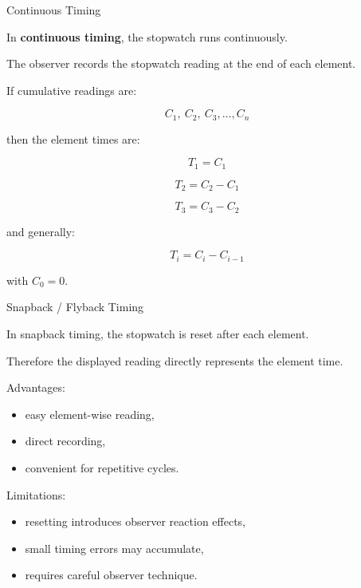 \documentclass[aspectratio=169,10pt]{beamer}
\begin{document}

\begin{frame}[shrink=18]{Continuous Timing}
\small

In \textbf{continuous timing}, the stopwatch runs continuously.

The observer records the stopwatch reading at the end of each element.

If cumulative readings are:

\[
C_1,\ C_2,\ C_3,\ldots,C_n
\]

then the element times are:

\[
T_1=C_1
\]

\[
T_2=C_2-C_1
\]

\[
T_3=C_3-C_2
\]

and generally:

\[
\boxed{
T_i=C_i-C_{i-1}
}
\]

with \(C_0=0\).

\end{frame}


\begin{frame}[shrink=18]{Snapback / Flyback Timing}
\small

In snapback timing, the stopwatch is reset after each element.

Therefore the displayed reading directly represents the element time.

Advantages:

\begin{itemize}
    \item easy element-wise reading,
    \item direct recording,
    \item convenient for repetitive cycles.
\end{itemize}

Limitations:

\begin{itemize}
    \item resetting introduces observer reaction effects,
    \item small timing errors may accumulate,
    \item requires careful observer technique.
\end{itemize}

\end{frame}

\end{document}
